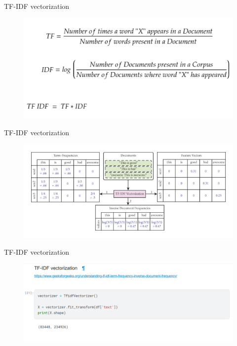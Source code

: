 \documentclass[serif, aspectratio=169]{beamer}
\begin{document}
	\begin{frame}{TF-IDF vectorization}
		\begin{figure}
			\centering
			\includegraphics[width=1\linewidth]{pic/tf-idf-formula.png}
			\label{fig:tf-idf-formula}
		\end{figure}
	\end{frame}
	\begin{frame}{TF-IDF vectorization}
		\begin{figure}
			\centering
			\includegraphics[width=1\linewidth]{pic/Illustration-of-TFIDF-vectorization.png}
			\label{fig:Illustration-of-TFIDF-vectorization}
		\end{figure}
	\end{frame}
	\begin{frame}{TF-IDF vectorization}
		\begin{figure}
			\centering
			\includegraphics[width=1\linewidth]{pic/tfidf-apply.png}
			\label{fig:tfidf-apply}
		\end{figure}
	\end{frame}
	
\end{document}
